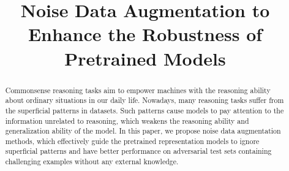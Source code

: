 \documentclass[conference]{IEEETran}
\title{Noise Data Augmentation to Enhance the Robustness of Pretrained Models}
\newcommand{\KZ}[1]{\textcolor{red}{Kenny: #1}}
\newcommand{\YZ}[1]{\textcolor{red}{Yizhu: #1}}
\begin{document}
\maketitle
\begin{abstract}
Commonsense reasoning tasks aim to 
empower machines with the reasoning ability 
about ordinary situations in
our daily life.
Nowadays, many reasoning tasks suffer from the superficial patterns in datasets.
Such patterns cause 
models to pay attention to the information unrelated to reasoning, 
which weakens the reasoning ability and generalization ability of the model.
In this paper, we propose
noise data augmentation methods, 
which effectively guide the 
pretrained representation models to ignore superficial patterns and  
have better performance on adversarial test sets containing challenging examples 
without any external knowledge.
\end{abstract}

	
	
	
	
	


 
\end{document}

